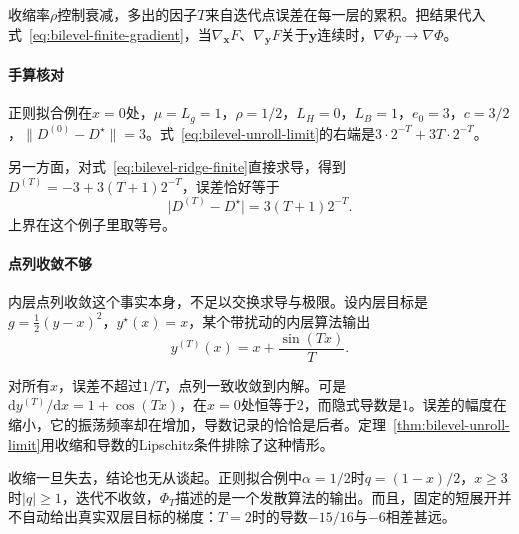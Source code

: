 收缩率$\rho$控制衰减，多出的因子$T$来自迭代点误差在每一层的累积。把结果代入式~\eqref{eq:bilevel-finite-gradient}，当$\nabla_{\bm{x}}F$、$\nabla_{\bm{y}}F$关于$\bm{y}$连续时，$\nabla\Phi_T\to\nabla\Phi$。

\paragraph{手算核对}
正则拟合例在$x=0$处，$\mu=L_g=1$，$\rho=1/2$，$L_H=0$，$L_B=1$，$e_0=3$，$c=3/2$，$\lVert D^{(0)}-D^\star\rVert=3$。式~\eqref{eq:bilevel-unroll-limit}的右端是$3\cdot2^{-T}+3T\cdot2^{-T}$。

另一方面，对式~\eqref{eq:bilevel-ridge-finite}直接求导，得到$D^{(T)}=-3+3(T+1)2^{-T}$，误差恰好等于
\[
 \lvert D^{(T)}-D^\star\rvert=3(T+1)2^{-T}.
\]
上界在这个例子里取等号。

\paragraph{点列收敛不够}
内层点列收敛这个事实本身，不足以交换求导与极限。设内层目标是$g=\frac12(y-x)^2$，$y^\star(x)=x$，某个带扰动的内层算法输出
\[
 y^{(T)}(x)=x+\frac{\sin(Tx)}{T}.
\]

对所有$x$，误差不超过$1/T$，点列一致收敛到内解。可是$\mathrm{d}y^{(T)}/\mathrm{d}x=1+\cos(Tx)$，在$x=0$处恒等于$2$，而隐式导数是$1$。误差的幅度在缩小，它的振荡频率却在增加，导数记录的恰恰是后者。定理~\ref{thm:bilevel-unroll-limit}用收缩和导数的Lipschitz条件排除了这种情形。

收缩一旦失去，结论也无从谈起。正则拟合例中$\alpha=1/2$时$q=(1-x)/2$，$x\geq3$时$\lvert q\rvert\geq1$，迭代不收敛，$\Phi_T$描述的是一个发散算法的输出。而且，固定的短展开并不自动给出真实双层目标的梯度：$T=2$时的导数$-15/16$与$-6$相差甚远。
